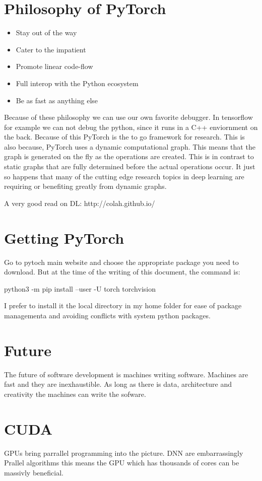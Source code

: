 \documentclass[11pt,twoside,a4paper]{report}
\begin{document}
\section{Philosophy of PyTorch}

\begin{itemize}
    \item Stay out of the way
    \item Cater to the impatient
    \item Promote linear code-flow
    \item Full interop with the Python ecosystem
    \item Be as fast as anything else
\end{itemize}

Because of these philosophy we can use our own favorite debugger. In tensorflow for example we can not debug the python, since it runs in a C++ enviornment on the back.
Because of this PyTorch is the to go framework for research. This is also because, PyTorch uses a dynamic computational graph. This means that the graph is generated on the fly as the operations are created. This is in contrast to static graphs that are fully determined before the actual operations occur.
It just so happens that many of the cutting edge research topics in deep learning are requiring or benefiting greatly from dynamic graphs. 

A very good read on DL: http://colah.github.io/

\section{Getting PyTorch}
Go to pytoch main website and choose the appropriate package you need to download.
But at the time of the writing of this document, the command is: 

python3 -m pip install --user -U torch torchvision

I prefer to install it the local directory in my home folder for ease of package managementa and avoiding conflicts with system python packages. 

\section{Future}
The future of software development is machines writing software. Machines are fast and they are inexhaustible. As long as there is data, architecture and creativity the machines can write the sofware.

\section{CUDA}
GPUs bring parrallel programming into the picture. DNN are embarrassingly Prallel algorithms this means the GPU which has thousands of cores can be massivly beneficial.
\end{document}
